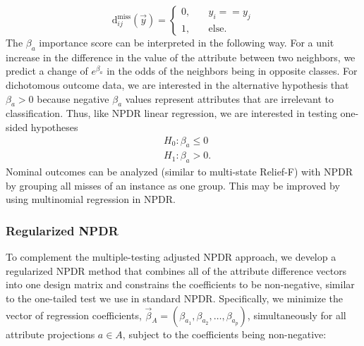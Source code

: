 \documentclass[10pt]{article}
\begin{document}
\begin{equation}\label{eq:hitdiff}
\text{d}^{\text{miss}}_{ij}(\vec{y}) = \left\{
    \begin{array}{ll}
        0, & \quad  y_{i} == y_{j} \\
        1, & \quad \text{else}.
    \end{array}
\right.
\end{equation}
The $\beta_a$ importance score can be interpreted in the following way. For a unit increase in the difference in the value of the attribute between two neighbors, we predict a change of $e^{\beta_a}$ in the odds of the neighbors being in opposite classes. For dichotomous outcome data, we are interested in the alternative hypothesis that $\beta_a>0$ because negative $\beta_a$ values represent attributes that are irrelevant to classification. Thus, like NPDR linear regression, we are interested in testing one-sided hypotheses
\begin{equation}
\begin{aligned}
    & H_0: \beta_a \le 0 \\
    & H_1: \beta_a > 0.
\end{aligned}
\end{equation}
Nominal outcomes can be analyzed (similar to multi-state Relief-F) with NPDR by grouping all misses of an instance as one group. This may be improved by using multinomial regression in NPDR. 

\subsubsection{Regularized NPDR}

To complement the multiple-testing adjusted NPDR approach, we develop a regularized NPDR method that combines all of the attribute difference vectors into one design matrix and constrains the coefficients to be non-negative, similar to the one-tailed test we use in standard NPDR.
Specifically, we minimize the vector of regression coefficients, $\vec{\beta}_A = (\beta_{a_1}, \beta_{a_2}, \ldots, \beta_{a_p})$, simultaneously for all attribute projections $a \in A$, subject to the coefficients being non-negative: 
\end{document}
